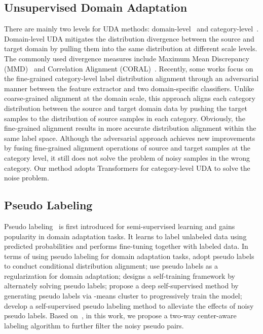 \documentclass[dvipsnames, svgnames, x11names, table]{article} \usepackage{iclr2022_conference,times}
\begin{document}
\begin{spacing}{1.0}
\subsection{Unsupervised Domain Adaptation}
There are mainly two levels for UDA methods: domain-level~\citep{tzeng2014deep,long2015learning,ghifary2016deep,tzeng2017adversarial,bousmalis2017unsupervised,hoffman2018cycada} and  category-level~\citep{saito2018maximum,kang2019contrastive,du2021cross,li2021cross}. Domain-level UDA mitigates the distribution divergence between the source and target domain by pulling them into the same distribution at different scale levels.  The commonly used divergence measures include Maximum Mean Discrepancy (MMD)~\citep{gretton2006kernel,tzeng2014deep,long2015learning} and Correlation Alignment (CORAL)~\citep{sun2016return,sun2016deep}.  Recently, some works \citep{saito2018maximum,du2021cross,li2021cross} focus on the fine-grained category-level label distribution alignment through an adversarial manner between the feature extractor and two domain-specific classifiers.  Unlike coarse-grained alignment at the domain scale, this approach aligns each category distribution between the source and target domain data by pushing the target samples to the distribution of source samples in each category. Obviously, the fine-grained alignment results in more accurate distribution alignment within the same label space. Although the adversarial approach achieves new improvements by fusing fine-grained alignment operations of source and target samples at the category level, it still does not solve the problem of noisy samples in the wrong category. Our method adopts Transformers for category-level UDA to solve the noise problem. 


\subsection{Pseudo Labeling}
Pseudo labeling~\citep{lee2013pseudo} is first introduced for semi-supervised learning and gains popularity in domain adaptation tasks. It learns to label unlabeled data using predicted probabilities and performs fine-tuning together with labeled data. In terms of using pseudo labeling for domain adaptation tasks, \citep{long2017deep,long2017conditional} adopt pseudo labels  to conduct conditional distribution alignment; \citep{zhang2018collaborative,choi2019pseudo} use pseudo labels as a regularization for domain adaptation; \citet{zou2018unsupervised} designs a self-training framework by alternately solving pseudo labels; \citet{caron2018deep} propose a deep self-supervised method by generating pseudo labels via -means cluster to progressively train the model; \citet{liang2020we} develop a self-supervised pseudo labeling method to alleviate the effects of noisy pseudo labels. Based on~\citet{liang2020we}, in this work, we propose a two-way center-aware labeling algorithm to further filter the noisy pseudo pairs. 


\end{spacing}
\end{document}
